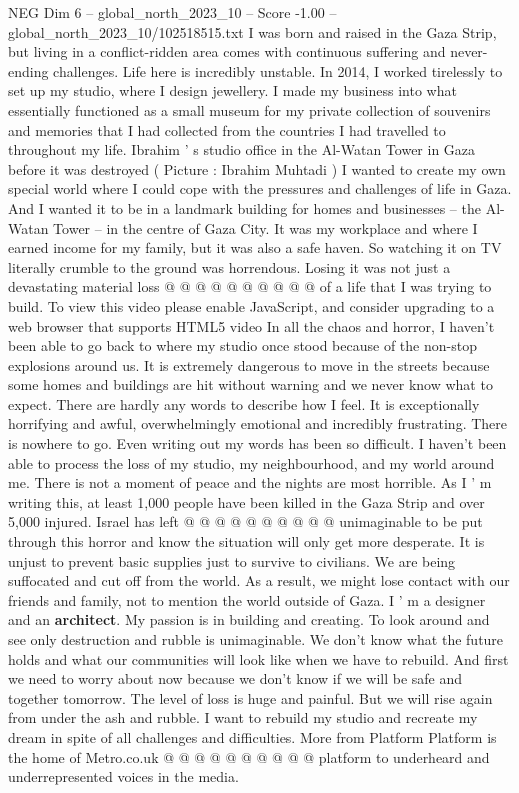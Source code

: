 \begin{textsample}{NEG Dim 6 – global\_north\_2023\_10 – Score -1.00 – global\_north\_2023\_10/102518515.txt}  \label{ex:f6_neg_196}
I was born and raised in the Gaza Strip, but living in a conflict-ridden area comes with continuous suffering and never-ending challenges.
Life here is incredibly unstable.
In 2014, I worked tirelessly to set up my studio, where I design jewellery.
I made my business into what essentially functioned as a small museum for my private collection of souvenirs and memories that I had collected from the countries I had travelled to throughout my life.
Ibrahim ' s studio office in the Al-Watan Tower in Gaza before it was destroyed ( Picture : Ibrahim Muhtadi ) I wanted to create my own special world where I could cope with the pressures and challenges of life in Gaza.
And I wanted it to be in a landmark building for homes and businesses -- the Al-Watan Tower -- in the centre of Gaza City.
It was my workplace and where I earned income for my family, but it was also a safe haven.
So watching it on TV literally crumble to the ground was horrendous.
Losing it was not just a devastating material loss @ @ @ @ @ @ @ @ @ @ of a life that I was trying to build.
To view this video please enable JavaScript, and consider upgrading to a web browser that supports HTML5 video In all the chaos and horror, I haven't been able to go back to where my studio once stood because of the non-stop explosions around us.
It is extremely dangerous to move in the streets because some homes and buildings are hit without warning and we never know what to expect.
There are hardly any words to describe how I feel.
It is exceptionally horrifying and awful, overwhelmingly emotional and incredibly frustrating.
There is nowhere to go.
Even writing out my words has been so difficult.
I haven't been able to process the loss of my studio, my neighbourhood, and my world around me.
There is not a moment of peace and the nights are most horrible.
As I ' m writing this, at least 1,000 people have been killed in the Gaza Strip and over 5,000 injured.
Israel has left @ @ @ @ @ @ @ @ @ @ unimaginable to be put through this horror and know the situation will only get more desperate.
It is unjust to prevent basic supplies just to survive to civilians.
We are being suffocated and cut off from the world.
As a result, we might lose contact with our friends and family, not to mention the world outside of Gaza.
I ' m a designer and an \textbf{architect}.
My passion is in building and creating.
To look around and see only destruction and rubble is unimaginable.
We don't know what the future holds and what our communities will look like when we have to rebuild.
And first we need to worry about now because we don't know if we will be safe and together tomorrow.
The level of loss is huge and painful.
But we will rise again from under the ash and rubble.
I want to rebuild my studio and recreate my dream in spite of all challenges and difficulties.
More from Platform Platform is the home of Metro.co.uk @ @ @ @ @ @ @ @ @ @ platform to underheard and underrepresented voices in the media.

\end{textsample}
